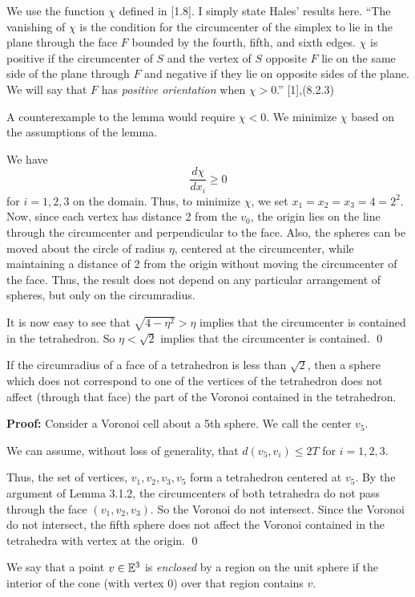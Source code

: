 We use the function $\chi$ defined in [1.8]. 
I simply state Hales' results here.
``The vanishing of $\chi$ is the condition for the
circumcenter of the simplex to lie
in the plane through the face $F$
bounded by the fourth,
fifth, and sixth edges.  $\chi$ is positive if the circumcenter of
$S$ and the vertex of $S$ opposite $F$ lie on the same side of the
plane through $F$ and negative if they lie on opposite sides
of the plane.  We will say that $F$ has {\it positive orientation\/}
when $\chi>0$.''  [1],(8.2.3)

A counterexample to the lemma would require $\chi < 0$.  We minimize $\chi$ based on the 
assumptions of the lemma.

We have $$\frac {d\chi}{dx_i}\geq 0$$ for $i=1,2,3$ on the domain.  Thus, to minimize $\chi$,
 we set $x_1=x_2=x_3=4=2^2$.  Now, since each vertex has distance 2 from the $v_0$, 
the origin lies on the line through the circumcenter and perpendicular to the face.  
Also, the spheres can be moved about the circle of radius $\eta$, centered at the circumcenter,
 while maintaining a distance of 2 from the origin without moving the circumcenter of the face. 
 Thus, the result does not depend on any particular arrangement of spheres, but only on the 
circumradius.  

It is now easy to see that $\sqrt{4-\eta^2} > \eta$ implies that the circumcenter is
 contained in the tetrahedron.  So $\eta < \sqrt 2$ implies that the circumcenter is 
contained.  \qed

 If the circumradius of a face of a tetrahedron is less than $\sqrt 2$,
 then a sphere which does not correspond to one of the vertices of the tetrahedron does not 
affect (through that face) the part of the Voronoi contained in the tetrahedron. \endproclaim

{\bf Proof:} Consider a Voronoi cell about a 5th sphere.  We call the center $v_5$.  

We can assume, without loss of generality, that $d(v_5,v_i)\le 2T$ for $i=1,2,3$. 

Thus, the set of vertices, $v_1,v_2,v_3,v_5$ form a tetrahedron centered at $v_5$.  
By the argument of Lemma 3.1.2, the circumcenters of both tetrahedra do not pass through the face $(v_1,v_2,v_3)$.  So the Voronoi do not intersect.  Since the Voronoi do not intersect, the fifth sphere does not affect the 
Voronoi contained in the tetrahedra with vertex at the origin.  \qed

\bigskip

We say that a point $v\in{\Bbb E}^3$ is {\it enclosed\/} by a region
on the unit sphere if the interior of the cone 
(with vertex $0$) over that region contains
$v$. 

